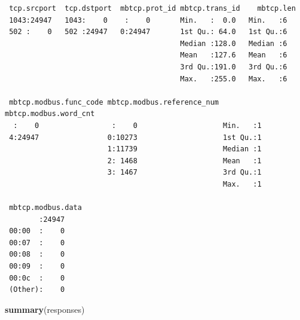 \documentclass[12pt,]{article}
\newenvironment{Shaded}{\begin{snugshade}}{\end{snugshade}}
\newcommand{\KeywordTok}[1]{\textcolor[rgb]{0.13,0.29,0.53}{\textbf{{#1}}}}
\newcommand{\NormalTok}[1]{{#1}}
\begin{document}
\begin{verbatim}
 tcp.srcport  tcp.dstport  mbtcp.prot_id mbtcp.trans_id    mbtcp.len
 1043:24947   1043:    0    :    0       Min.   :  0.0   Min.   :6  
 502 :    0   502 :24947   0:24947       1st Qu.: 64.0   1st Qu.:6  
                                         Median :128.0   Median :6  
                                         Mean   :127.6   Mean   :6  
                                         3rd Qu.:191.0   3rd Qu.:6  
                                         Max.   :255.0   Max.   :6  
                                                                    
 mbtcp.modbus.func_code mbtcp.modbus.reference_num mbtcp.modbus.word_cnt
  :    0                 :    0                    Min.   :1            
 4:24947                0:10273                    1st Qu.:1            
                        1:11739                    Median :1            
                        2: 1468                    Mean   :1            
                        3: 1467                    3rd Qu.:1            
                                                   Max.   :1            
                                                                        
 mbtcp.modbus.data
        :24947    
 00:00  :    0    
 00:07  :    0    
 00:08  :    0    
 00:09  :    0    
 00:0c  :    0    
 (Other):    0    
\end{verbatim}

\begin{Shaded}
\begin{Highlighting}[]
\KeywordTok{summary}\NormalTok{(responses)}
\end{Highlighting}
\end{Shaded}
\end{document}
